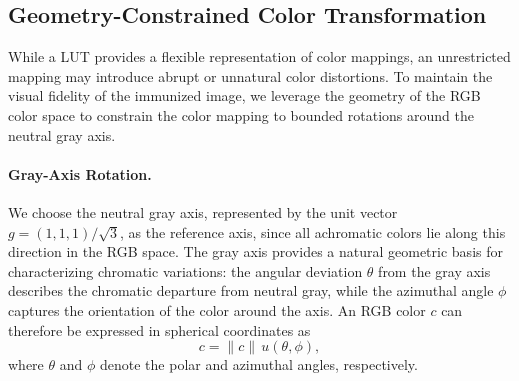 
\subsection{Geometry-Constrained Color Transformation}
\label{sec:feasible}
While a LUT provides a flexible representation of color mappings, an unrestricted mapping may introduce abrupt or unnatural color distortions. To maintain the visual fidelity of the immunized image, we leverage the geometry of the RGB color space to constrain the color mapping to bounded rotations around the neutral gray axis.

\paragraph{Gray-Axis Rotation. }
We choose the neutral gray axis, represented by the unit vector $g=(1,1,1)/\sqrt{3}$, as the reference axis, since all achromatic colors lie along this direction in the RGB space. The gray axis provides a natural geometric basis for characterizing chromatic variations: the angular deviation $\theta$ from the gray axis describes the chromatic departure from neutral gray, while the azimuthal angle $\phi$ captures the orientation of the color around the axis. An RGB color $c$ can therefore be expressed in spherical coordinates as
\begin{equation}
c = \|c\|\,u(\theta,\phi),
\label{eq:spherical}
\end{equation}
where $\theta$ and $\phi$ denote the polar and azimuthal angles, respectively. 

